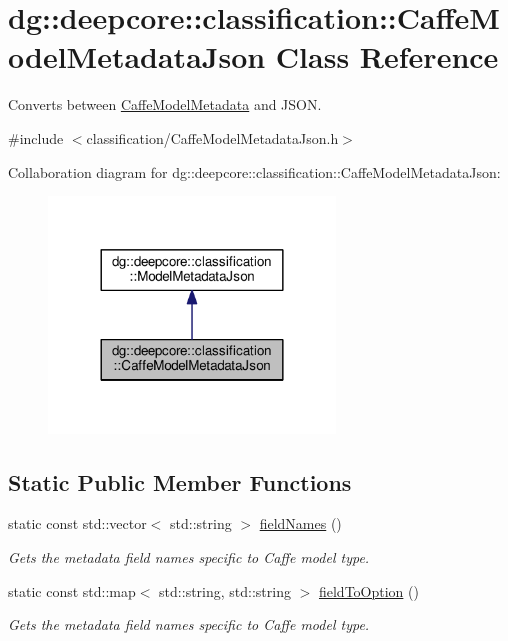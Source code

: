 \hypertarget{classdg_1_1deepcore_1_1classification_1_1_caffe_model_metadata_json}{}\section{dg\+:\+:deepcore\+:\+:classification\+:\+:Caffe\+Model\+Metadata\+Json Class Reference}
\label{classdg_1_1deepcore_1_1classification_1_1_caffe_model_metadata_json}


Converts between \hyperlink{structdg_1_1deepcore_1_1classification_1_1_caffe_model_metadata}{Caffe\+Model\+Metadata} and J\+S\+ON.  




{\ttfamily \#include $<$classification/\+Caffe\+Model\+Metadata\+Json.\+h$>$}



Collaboration diagram for dg\+:\+:deepcore\+:\+:classification\+:\+:Caffe\+Model\+Metadata\+Json\+:
\nopagebreak
\begin{figure}[H]
\begin{center}
\leavevmode
\includegraphics[width=216pt]{classdg_1_1deepcore_1_1classification_1_1_caffe_model_metadata_json__coll__graph}
\end{center}
\end{figure}
\subsection*{Static Public Member Functions}
\begin{DoxyCompactItemize}
\item 
static const std\+::vector$<$ std\+::string $>$ \hyperlink{group___classification_module_gafcf3ba2ab411e7a7a232dcb4d8be8bcd}{field\+Names} ()
\begin{DoxyCompactList}\small\item\em Gets the metadata field names specific to Caffe model type. \end{DoxyCompactList}\item 
static const std\+::map$<$ std\+::string, std\+::string $>$ \hyperlink{group___classification_module_ga902389ddc019d347447a900ad76cf8f3}{field\+To\+Option} ()
\begin{DoxyCompactList}\small\item\em Gets the metadata field names specific to Caffe model type. \end{DoxyCompactList}\end{DoxyCompactItemize}
